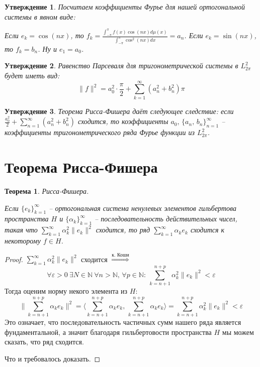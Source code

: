 \documentclass[a4paper,12pt]{article}
\theoremstyle{plain}
\newtheorem{theorem}{Теорема}[section]
\newtheorem{proposition}{Утверждение}[section]
\theoremstyle{definition}
\theoremstyle{remark}
\begin{document}
\begin{proposition}
	Посчитаем коэффициенты Фурье для нашей ортогональной системы в явном виде:

	Если $e_k = \cos(nx)$, то $f_k = \frac{\int_{-\pi}^\pi f(x)\cos(nx)d\mu(x)}{\int_{-\pi}^\pi \cos^2(nx)dx} = a_n$.
	Если $e_k = \sin(nx)$, то $f_k = b_n$.
	Ну и $e_1 = a_0$.
\end{proposition}

\begin{proposition}
	Равенство Парсеваля для тригонометрической системы в $L^2_{2\pi}$ будет иметь вид:
	\[\|f\|^2 = a_0^2\cdot\frac{\pi}{2} + \sum_{k = 1}^\infty (a_n^2 + b_n^2)\pi\]
\end{proposition}

\begin{proposition}
	Теорема Рисса-Фишера даёт следующее следствие: если $\frac{a_0^2}{2} + \sum_{n = 1}^\infty (a_n^2 + b_n^2)$ сходится, то коэффициенты $a_0,\, \{a_n,\,b_n\}_{n = 1}^\infty$ -- коэффициенты тригонометрического ряда Фурье функции из $L_{2\pi}^2$.
\end{proposition}

\section{Теорема Рисса-Фишера}
\begin{theorem}
	Рисса-Фишера.

	Если $\{e_k\}_{k = 1}^\infty$ -- ортогональная система ненулевых элементов гильбертова пространства $H$ и $\{\alpha_k\}_{k = 1}^\infty$ -- последовательность действительных чисел, такая что $\sum_{k = 1}^\infty \alpha_k^2 \|e_k\|^2$ сходится, то ряд $\sum_{k = 1}^\infty \alpha_ke_k$ сходится к некоторому $f \in H$.
\end{theorem}

\begin{proof}
	$\sum_{k = 1}^\infty \alpha_k^2\|e_k\|^2$ сходится $\stackrel{\text{к. Коши}}{\Rightarrow}$
	\[\forall \varepsilon > 0 \: \exists N \in \mathbb{N} \: \forall n > \mathbb{N},\, \forall p \in \mathbb{N}:\: \sum_{k = n + 1}^{n + p} \alpha_k^2\|e_k\|^2 < \varepsilon\]
	Тогда оценим норму некого элемента из $H$:
	\[\|\sum_{k = n + 1}^{n + p}\alpha_ke_k\|^2 = \langle\sum_{k = n + 1}^{n + p}\alpha_ke_k,\, \sum_{k = n + 1}^{n + p}\alpha_ke_k\rangle = \sum_{k = n + 1}^{n + p}\alpha_k^2\|e_k\|^2 < \varepsilon\]
	Это означает, что последовательность частичных сумм нашего ряда является фундаментальной, а значит благодаря гильбертовости пространства $H$ мы можем сказать, что ряд сходится.
	
	Что и требовалось доказать.
\end{proof}
\end{document}
